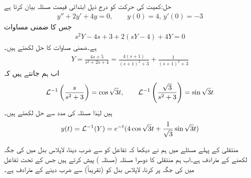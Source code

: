 حل:کمیت کی حرکت کو درج ذیل ابتدائی قیمت مسئلہ بیان کرتا ہے
\begin{align*}
y''+2y'+4y=0,\quad \quad y(0)=4, \, y'(0)=-3
\end{align*}
جس کا ضمنی مساوات 
\begin{align*}
s^2Y-4s+3+2(sY-4)+4Y=0
\end{align*}
ہے۔ضمنی مساوات کا حل لکھتے ہیں۔
\begin{align*}
Y=\frac{4s+5}{s^2+2s+4}=\frac{4(s+1)}{(s+1)^2+3}+\frac{1}{(s+1)^2+3}
\end{align*}
اب ہم جانتے ہیں کہ
\begin{align*}
\mathcal{L}^{-1}\left(\frac{s}{s^2+3}\right)=\cos \sqrt{3}t, \quad \quad \mathcal{L}^{-1}\left(\frac{\sqrt{3}}{s^2+3}\right)=\sin \sqrt{3}t
\end{align*}
ہیں لہٰذا مسئلہ  کی مدد سے حل لکھتے ہیں۔
\begin{align*}
y(t)=\mathcal{L}^{-1}(Y)=e^{-t}(4\cos \sqrt{3}t+\frac{1}{\sqrt{3}}\sin \sqrt{3}t)
\end{align*}

منتقلی کے پہلے مسئلے میں ہم نے دیکھا کہ تفاعل  کو  سے ضرب دینا، لاپلاس بدل میں  کی جگہ  لکھنے کے مترادف ہے۔اب ہم منتقلی کا دوسرا مسئلہ (مسئلہ ) پیش کرتے ہیں جس کے تحت تفاعل  میں  کی جگہ  پر کرنا، لاپلاس بدل  کو (تقریباً)  سے ضرب دینے کے مترادف ہے۔

